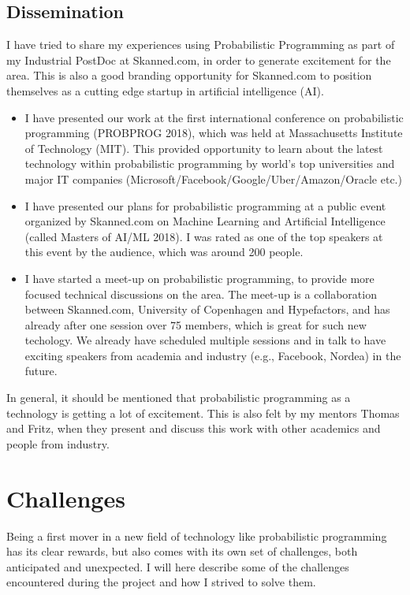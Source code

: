 \documentclass[12pt,a4paper]{article}
\begin{document}
\subsection{Dissemination}
I have tried to share my experiences using Probabilistic Programming as part of
my Industrial PostDoc at Skanned.com, in order to generate excitement for the
area. This is also a good branding opportunity for Skanned.com to position
themselves as a cutting edge startup in artificial intelligence (AI).
\begin{itemize}
\item I have presented our work at the first international conference on
  probabilistic programming (PROBPROG 2018), which was held at Massachusetts Institute of
  Technology (MIT). This provided opportunity to learn about the latest
  technology within probabilistic programming by world's top universities and
  major IT companies (Microsoft/Facebook/Google/Uber/Amazon/Oracle etc.)
\item I have presented our plans for probabilistic programming at a public event
  organized by Skanned.com on Machine Learning and Artificial Intelligence
  (called Masters of AI/ML 2018). I was rated as one of the top speakers at this
  event by the audience, which was around 200 people.
\item I have started a meet-up on probabilistic programming, to provide more
  focused technical discussions on the area. The meet-up is a collaboration
  between Skanned.com, University of Copenhagen and Hypefactors, and has already
  after one session over 75 members, which is great for such new techology. We
  already have scheduled multiple sessions and in talk to have exciting speakers from
  academia and industry (e.g., Facebook, Nordea) in the future.
\end{itemize}
In general, it should be mentioned that probabilistic programming as a
technology is getting a lot of excitement. This is also felt by my mentors
Thomas and Fritz, when they present and discuss this work with other academics
and people from industry.

\section{Challenges}
Being a first mover in a new field of technology like probabilistic programming
has its clear rewards, but also comes with its own set of challenges, both
anticipated and unexpected. I will here describe some of the challenges
encountered during the project and how I strived to solve them.
\end{document}
